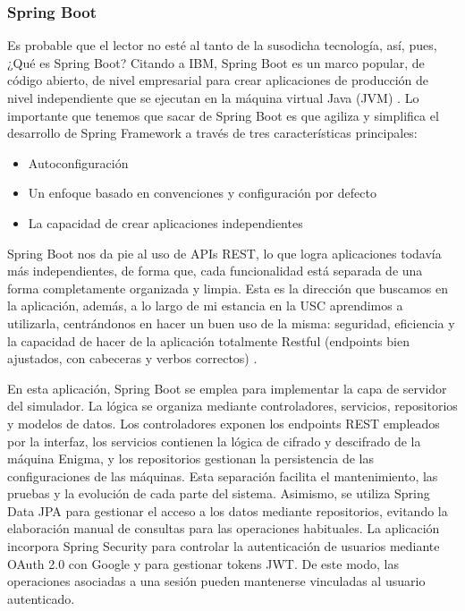 \subsubsection {Spring Boot}
Es probable que el lector no esté al tanto de la susodicha tecnología, así, pues, ¿Qué es Spring Boot? Citando a IBM, Spring Boot es un marco popular, de código abierto, de nivel empresarial para crear aplicaciones de producción de nivel independiente que se ejecutan en la máquina virtual Java (JVM) \cite{ibm_spring_boot}. Lo importante que tenemos que sacar de Spring Boot es que agiliza y simplifica el desarrollo de Spring Framework a través de tres características principales:
\begin{itemize}
	\item Autoconfiguración
	\item Un enfoque basado en convenciones y configuración por defecto
	\item La capacidad de crear aplicaciones independientes \cite{ibm_spring_boot}
\end{itemize}

Spring Boot nos da pie al uso de APIs REST, lo que logra aplicaciones todavía más independientes, de forma que, cada funcionalidad está separada de una forma completamente organizada y limpia. Esta es la dirección que buscamos en la aplicación, además, a lo largo de mi estancia en la USC aprendimos a utilizarla, centrándonos en hacer un buen uso de la misma: seguridad, eficiencia y la capacidad de hacer de la aplicación totalmente Restful (endpoints bien ajustados, con cabeceras y verbos correctos) \cite{ibm_spring_boot}.

En esta aplicación, Spring Boot se emplea para implementar la capa de servidor del simulador. La lógica se organiza mediante controladores, servicios, repositorios y modelos de datos. Los controladores exponen los endpoints REST empleados por la interfaz, los servicios contienen la lógica de cifrado y descifrado de la máquina Enigma, y los repositorios gestionan la persistencia de las configuraciones de las máquinas. Esta separación facilita el mantenimiento, las pruebas y la evolución de cada parte del sistema.
Asimismo, se utiliza Spring Data JPA para gestionar el acceso a los datos mediante repositorios, evitando la elaboración manual de consultas para las operaciones habituales. La aplicación incorpora Spring Security para controlar la autenticación de usuarios mediante OAuth 2.0 con Google y para gestionar tokens JWT. De este modo, las operaciones asociadas a una sesión pueden mantenerse vinculadas al usuario autenticado.

